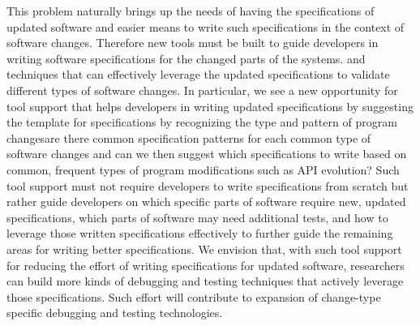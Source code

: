 This problem naturally brings up the needs of having the specifications of updated software and easier means to write such specifications in the context of software changes. Therefore new tools must be built to guide developers in writing software specifications for the changed parts of the systems. 
and techniques that can effectively leverage the updated specifications to validate different types of software changes. 
In particular, we see a new opportunity for tool support that helps developers in writing updated specifications by suggesting the template for specifications by recognizing the type and pattern of program changes\textemdash are there common specification patterns for each common type of software changes and can we then suggest which specifications to write based on common, frequent types of program modifications such as API evolution? Such tool support must not require developers to write specifications from scratch but rather guide developers on which specific parts of software require new, updated specifications, which parts of software may need additional tests, and how to leverage those written specifications effectively to further guide the remaining areas for writing better specifications. We envision that, with such tool support for reducing the effort of writing specifications for updated software, researchers can build more kinds of debugging and testing techniques that actively leverage those specifications. Such effort will contribute to expansion of change-type specific debugging and testing technologies. 

